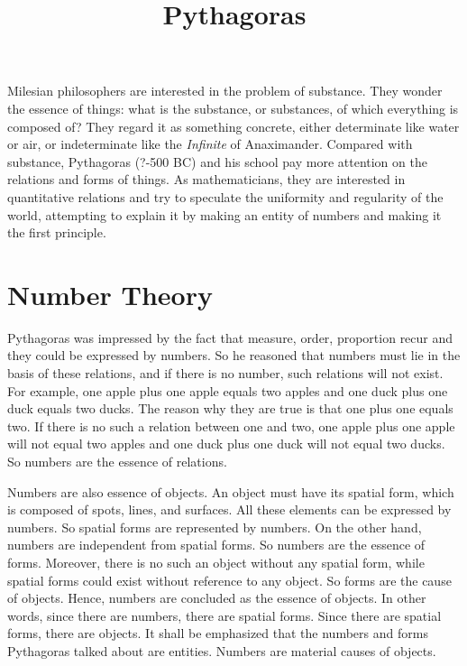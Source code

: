 \documentclass[11pt]{article}
\title{Pythagoras}
\date{}
\begin{document}
  \maketitle

  \linenumbers
  
Milesian philosophers are interested in the problem of substance. 
They wonder the essence of things: what is the substance, or substances, of which everything is composed of? 
They regard it as something concrete, either determinate like water or air, or indeterminate like the \textit{Infinite} of Anaximander. 
Compared with substance, Pythagoras (?-500 BC) and his school pay more attention on the relations and forms of things. 
As mathematicians, they are interested in quantitative relations and try to speculate the uniformity and regularity of the world, attempting to explain it by making an entity of numbers and making it the first principle.

\section{Number Theory}
Pythagoras was impressed by the fact that measure, order, proportion recur and they could be expressed by numbers. 
So he reasoned that numbers must lie in the basis of these relations, and if there is no number, such relations will not exist. 
For example, one apple plus one apple equals two apples and one duck plus one duck equals two ducks. 
The reason why they are true is that one plus one equals two. 
If there is no such a relation between one and two, one apple plus one apple will not equal two apples and one duck plus one duck will not equal two ducks. 
So numbers are the essence of relations.

\newline

Numbers are also essence of objects. 
An object must have its spatial form, which is composed of spots, lines, and surfaces. 
All these elements can be expressed by numbers. 
So spatial forms are represented by numbers. 
On the other hand, numbers are independent from spatial forms. 
So numbers are the essence of forms. 
Moreover, there is no such an object without any spatial form, while spatial forms could exist without reference to any object. 
So forms are the cause of objects. 
Hence, numbers are concluded as the essence of objects. 
In other words, since there are numbers, there are spatial forms. 
Since there are spatial forms, there are objects. 
It shall be emphasized that the numbers and forms Pythagoras talked about are entities. 
Numbers are material causes of objects. 
\end{document}

